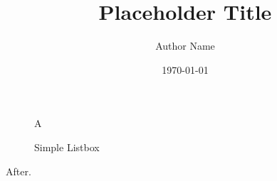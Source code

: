 \documentclass[
	verbose,
	english,
	type=bachelor-thesis, %
	field=Computer\ Science, %
	license=CCBY, %
	paper=a4,  %
]{thesis}
\title{Placeholder Title}
\author{Author Name}
\date{\today}
\begin{document}
\begin{figure}[h]
    \begin{listbox}{A}
    \end{listbox}
    \vspace{-2mm}
    \caption{Simple Listbox}
    \label{fig:simple-listbox}
\end{figure}
After.
\gdef\SatexReachedEnd{}
\end{document}
